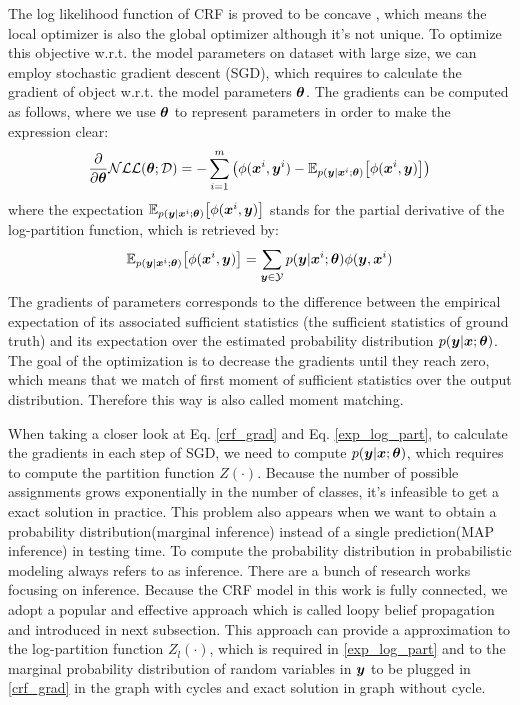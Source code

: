 The log likelihood function of CRF is proved to be concave \cite{koller2009probabilistic}, which means the local optimizer is also the global optimizer although it's not unique. To optimize this objective w.r.t. the model parameters on dataset with large size, we can employ stochastic gradient descent (SGD), which requires to calculate the gradient of object w.r.t. the model parameters $\boldsymbol \theta$. The gradients can be computed as follows, where we use $\boldsymbol \theta$ to represent parameters in order to make the expression clear:
\begin{equation}
\label{crf_grad}
\frac{\partial}{\partial \boldsymbol \theta} \mathcal{NLL}(\boldsymbol \theta; \mathcal{D}) = -\sum_{i=1}^{m}
\big(
\phi(\boldsymbol x^i, \boldsymbol y^i) - 
\mathbb{E}_{p(\boldsymbol y|\boldsymbol x^i;\boldsymbol \theta)}
\big[\phi(\boldsymbol x^i, \boldsymbol y)\big]
\big)
\end{equation}
where the expectation $\mathbb{E}_{p(\boldsymbol y|\boldsymbol x^i;\boldsymbol \theta)}
\big[\phi(\boldsymbol x^i, \boldsymbol y)\big]$ stands for the partial derivative of the log-partition function, which is retrieved by:
\begin{equation}
\label{exp_log_part}
\mathbb{E}_{p(\boldsymbol y|\boldsymbol x^i;\boldsymbol \theta)}
\big[\phi(\boldsymbol x^i, \boldsymbol y)\big] = \sum_{\boldsymbol y\in\mathcal{Y}}p(\boldsymbol y|\boldsymbol x^i;\boldsymbol \theta)\phi(\boldsymbol y, \boldsymbol x^i)
\end{equation}
The gradients of parameters corresponds to the difference between the empirical expectation of its associated sufficient statistics (the sufficient statistics of ground truth) and its expectation over the estimated probability distribution $p(\boldsymbol y|\boldsymbol x; \boldsymbol \theta)$. The goal of the optimization is to decrease the gradients until they reach zero, which means that we match of first moment of sufficient statistics over the output distribution. Therefore this way is also called moment matching.

When taking a closer look at Eq. \ref{crf_grad} and Eq. \ref{exp_log_part}, to calculate the gradients in each step of SGD, we need to compute $p(\boldsymbol y|\boldsymbol x; \boldsymbol \theta)$, which requires to compute the partition function $Z(\cdot)$. Because the number of possible assignments grows exponentially in the number of classes, it's infeasible to get a exact solution in practice. This problem also appears when we want to obtain a probability distribution(marginal inference) instead of a single prediction(MAP inference) in testing time. To compute the probability distribution in probabilistic modeling always refers to as inference. There are a bunch of research works focusing on inference. Because the CRF model in this work is fully connected, we adopt a popular and effective approach which is called loopy belief propagation and introduced in next subsection. This approach can provide a approximation to the log-partition function $Z_l(\cdot)$, which is required in \ref{exp_log_part} and to the marginal probability distribution of random variables in $\boldsymbol y$ to be plugged in \ref{crf_grad} in the graph with cycles and exact solution in graph without cycle.



